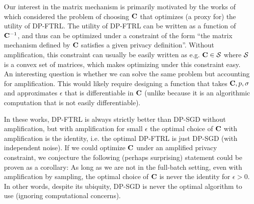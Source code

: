 Our interest in the matrix mechanism is primarily motivated by the works of \cite{denisovDPMF, MEMF, BandedMF} which considered the problem of choosing $\mathbf{C}$ that optimizes (a proxy for) the utility of DP-FTRL. The utility of DP-FTRL can be written as a function of $\mathbf{C}^{-1}$, and thus can be optimized under a constraint of the form ``the matrix mechanism defined by $\mathbf{C}$ satisfies a given privacy definition''. Without amplification, this constraint can usually be easily written as e.g. $\mathbf{C} \in \mathcal{S}$ where $\mathcal{S}$ is a convex set of matrices, which makes optimizing under this constraint easy. An interesting question is whether we can solve the same problem but accounting for amplification. This would likely require designing a function that takes $\mathbf{C}, p, \sigma$ and approximates $\epsilon$ that is differentiable in $\mathbf{C}$ (unlike \MMCC{} because it is an algorithmic computation that is not easily differentiable).

In these works, DP-FTRL is always strictly better than DP-SGD without amplification, but with amplification for small $\epsilon$ the optimal choice of $\mathbf{C}$ with amplification is the identity, i.e. the optimal DP-FTRL is just DP-SGD (with independent noise). If we could optimize $\mathbf{C}$ under an amplified privacy constraint, we conjecture the following (perhaps surprising) statement could be proven as a corollary: As long as we are not in the full-batch setting, even with amplification by sampling, the optimal choice of $\mathbf{C}$ is never the identity for $\epsilon > 0$. In other words, despite its ubiquity, DP-SGD is never the optimal algorithm to use (ignoring computational concerns).